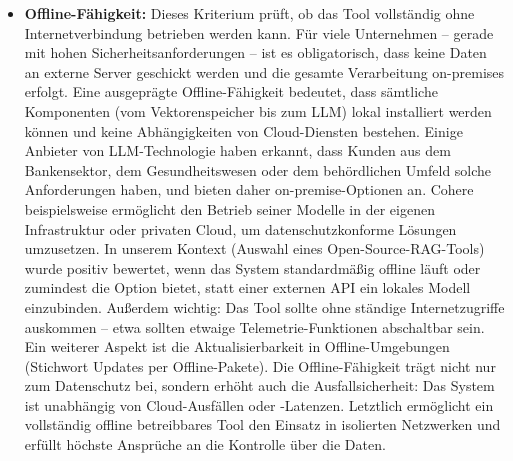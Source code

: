 \begin{itemize}
    \item \textbf{Offline-Fähigkeit:} Dieses Kriterium prüft, ob das Tool vollständig ohne Internetverbindung betrieben werden kann. Für viele Unternehmen – gerade mit hohen Sicherheitsanforderungen – ist es obligatorisch, dass keine Daten an externe Server geschickt werden und die gesamte Verarbeitung on-premises erfolgt. Eine ausgeprägte Offline-Fähigkeit bedeutet, dass sämtliche Komponenten (vom Vektorenspeicher bis zum LLM) lokal installiert werden können und keine Abhängigkeiten von Cloud-Diensten bestehen. Einige Anbieter von LLM-Technologie haben erkannt, dass Kunden aus dem Bankensektor, dem Gesundheitswesen oder dem behördlichen Umfeld solche Anforderungen haben, und bieten daher on-premise-Optionen an. Cohere beispielsweise ermöglicht den Betrieb seiner Modelle in der eigenen Infrastruktur oder privaten Cloud, um datenschutzkonforme Lösungen umzusetzen. In unserem Kontext (Auswahl eines Open-Source-RAG-Tools) wurde positiv bewertet, wenn das System standardmäßig offline läuft oder zumindest die Option bietet, statt einer externen API ein lokales Modell einzubinden. Außerdem wichtig: Das Tool sollte ohne ständige Internetzugriffe auskommen – etwa sollten etwaige Telemetrie-Funktionen abschaltbar sein. Ein weiterer Aspekt ist die Aktualisierbarkeit in Offline-Umgebungen (Stichwort Updates per Offline-Pakete). Die Offline-Fähigkeit trägt nicht nur zum Datenschutz bei, sondern erhöht auch die Ausfallsicherheit: Das System ist unabhängig von Cloud-Ausfällen oder -Latenzen. Letztlich ermöglicht ein vollständig offline betreibbares Tool den Einsatz in isolierten Netzwerken und erfüllt höchste Ansprüche an die Kontrolle über die Daten.

\end{itemize}
